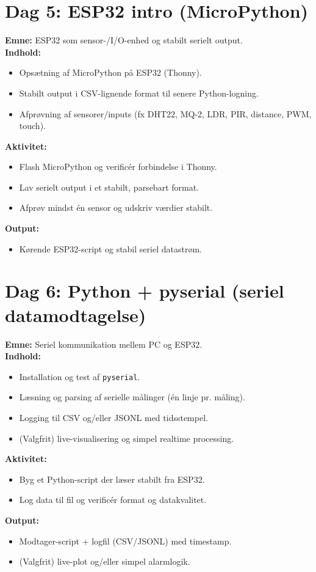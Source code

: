 \documentclass[a4paper,11pt]{article}
\begin{document}
\section{Dag 5: ESP32 intro (MicroPython)}

\textbf{Emne:} ESP32 som sensor-/I/O-enhed og stabilt serielt output.\\
\textbf{Indhold:}
\begin{itemize}
  \item Opsætning af MicroPython på ESP32 (Thonny).
  \item Stabilt output i CSV-lignende format til senere Python-logning.
  \item Afprøvning af sensorer/inputs (fx DHT22, MQ-2, LDR, PIR, distance, PWM, touch).
\end{itemize}
\textbf{Aktivitet:}
\begin{itemize}
  \item Flash MicroPython og verificér forbindelse i Thonny.
  \item Lav serielt output i et stabilt, parsebart format.
  \item Afprøv mindst én sensor og udskriv værdier stabilt.
\end{itemize}
\textbf{Output:}
\begin{itemize}
  \item Kørende ESP32-script og stabil seriel datastrøm.
\end{itemize}


\section{Dag 6: Python + pyserial (seriel datamodtagelse)}

\textbf{Emne:} Seriel kommunikation mellem PC og ESP32.\\
\textbf{Indhold:}
\begin{itemize}
  \item Installation og test af \texttt{pyserial}.
  \item Læsning og parsing af serielle målinger (én linje pr. måling).
  \item Logging til CSV og/eller JSONL med tidsstempel.
  \item (Valgfrit) live-visualisering og simpel realtime processing.
\end{itemize}
\textbf{Aktivitet:}
\begin{itemize}
  \item Byg et Python-script der læser stabilt fra ESP32.
  \item Log data til fil og verificér format og datakvalitet.
\end{itemize}
\textbf{Output:}
\begin{itemize}
  \item Modtager-script + logfil (CSV/JSONL) med timestamp.
  \item (Valgfrit) live-plot og/eller simpel alarmlogik.
\end{itemize}
\end{document}
